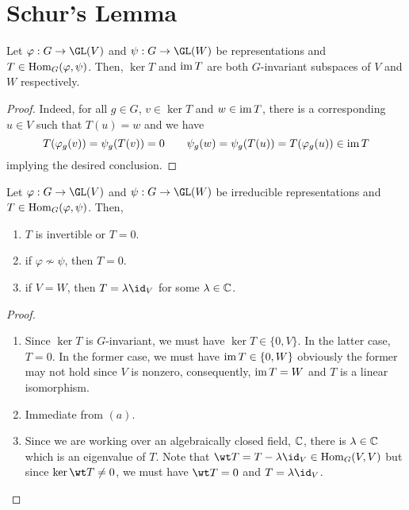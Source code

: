 \section{Schur's Lemma}

\begin{proposition}
    Let $\varphi: G\to\GL(V)$ and $\psi: G\to\GL(W)$ be representations and $T\in\operatorname{Hom}_G(\varphi,\psi)$. Then, $\ker T$ and $\operatorname{im} T$ are both $G$-invariant subspaces of $V$ and $W$ respectively.
\end{proposition}
\begin{proof}
    Indeed, for all $g\in G$, $v\in\ker T$ and $w\in\operatorname{im} T$, there is a corresponding $u\in V$ such that $T(u) = w$ and we have 
    \begin{equation*}
        T(\varphi_g(v)) = \psi_g(T(v)) = 0\qquad\psi_g(w) = \psi_g(T(u)) = T(\varphi_g(u))\in\operatorname{im} T
    \end{equation*}
    implying the desired conclusion.
\end{proof}

\begin{lemma}[Schur]
    Let $\varphi: G\to\GL(V)$ and $\psi: G\to\GL(W)$ be irreducible representations and $T\in\operatorname{Hom}_G(\varphi,\psi)$. Then, 
    \begin{enumerate}[label=(\alph*)]
        \item $T$ is invertible or $T = 0$.
        \item if $\varphi\not\sim\psi$, then $T = 0$.
        \item if $V = W$, then $T = \lambda\id_V$ for some $\lambda\in\mathbb{C}$.
    \end{enumerate}
\end{lemma}
\begin{proof}
\begin{enumerate}[label=(\alph*)]
    \item Since $\ker T$ is $G$-invariant, we must have $\ker T\in\{0,V\}$. In the latter case, $T = 0$. In the former case, we must have $\operatorname{im} T\in\{0, W\}$ obviously the former may not hold since $V$ is nonzero, consequently, $\operatorname{im} T = W$ and $T$ is a linear isomorphism.

    \item Immediate from $(a)$. 

    \item Since we are working over an algebraically closed field, $\mathbb{C}$, there is $\lambda\in\mathbb{C}$ which is an eigenvalue of $T$. Note that $\wt T = T - \lambda\id_V\in\Hom_G(V,V)$ but since $\ker\wt T\ne 0$, we must have $\wt T = 0$ and $T = \lambda\id_V$.
\end{enumerate}
\end{proof}

